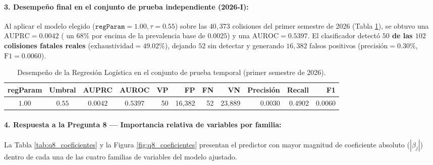 \paragraph{3. Desempeño final en el conjunto de prueba independiente (2026-I):}
Al aplicar el modelo elegido ($\texttt{regParam} = 1.00, \tau = 0.55$) sobre las $40,373$ colisiones del primer semestre de 2026 (Tabla \ref{tab:lr_test_final}), se obtuvo una \textbf{$\text{AUPRC} = 0.0042$} ( un $68\%$ por encima de la prevalencia base de $0.0025$) y una \textbf{$\text{AUROC} = 0.5397$}. El clasificador detectó \textbf{$50$ de las $102$ colisiones fatales reales} ($\text{exhaustividad} = 49.02\%$), dejando $52$ sin detectar y generando $16,382$ falsos positivos ($\text{precisión} = 0.30\%$, $\text{F1} = 0.0060$).

\begin{table}[H]
\centering
\small
\renewcommand{\arraystretch}{1.2}
\caption{Desempeño de la Regresión Logística en el conjunto de prueba temporal (primer semestre de 2026).}
\label{tab:lr_test_final}
\begin{tabular}{c c c c r r r r r r r}
\toprule
\textbf{regParam} & \textbf{Umbral} & \textbf{AUPRC} & \textbf{AUROC} & \textbf{VP} & \textbf{FP} & \textbf{FN} & \textbf{VN} & \textbf{Precisión} & \textbf{Recall} & \textbf{F1} \\
\midrule
$1.00$ & $0.55$ & $0.0042$ & $0.5397$ & 50 & 16,382 & 52 & 23,889 & $0.0030$ & $0.4902$ & $0.0060$ \\
\bottomrule
\end{tabular}
\end{table}

\paragraph{4. Respuesta a la Pregunta 8 --- Importancia relativa de variables por familia:}
La Tabla \ref{tab:q8_coeficientes} y la Figura \ref{fig:q8_coeficientes} presentan el predictor con mayor magnitud de coeficiente absoluto ($|\beta_j|$) dentro de cada una de las cuatro familias de variables del modelo ajustado.

